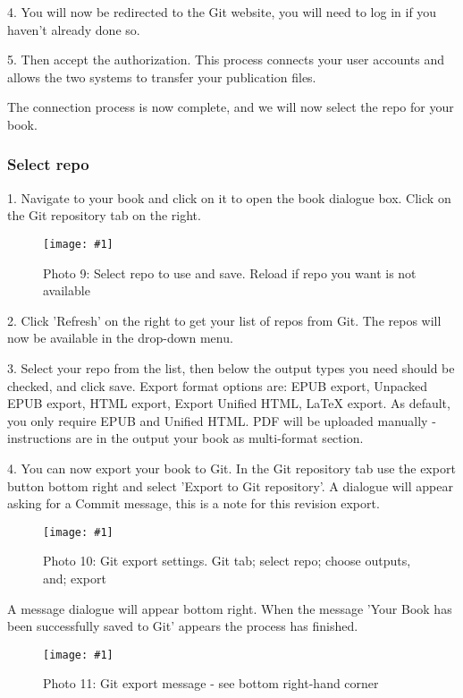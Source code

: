 \documentclass{article}
\newlength{\imgwidth}
\newcommand\scaledgraphics[2]{%
                
\settowidth{\imgwidth}{\texttt{[image: \#1]}}%
                
\setlength{\imgwidth}{\minof{\imgwidth}{#2\textwidth}}%
                
\texttt{[image: \#1]}%
                
}
\begin{document}
4. You will now be redirected to the Git website, you will need to log in if you haven't already done so.


5. Then accept the authorization. This process connects your user accounts and allows the two systems to transfer your publication files.


The connection process is now complete, and we will now select the repo for your book.


\subsubsection{Select repo}\label{H5346176}



1. Navigate to your book and click on it to open the book dialogue box. Click on the Git repository tab on the right.

\begin{figure}
\scaledgraphics{4b4e00ad-cd99-40b1-bb1e-5689bafe807a.png}{1}
\caption*{Photo 9: Select repo to use and save. Reload if repo you want is not available}\label{F77242471}
\end{figure}


2. Click 'Refresh' on the right to get your list of repos from Git. The repos will now be available in the drop-down menu.


3. Select your repo from the list, then below the output types you need should be checked, and click save. Export format options are: EPUB export, Unpacked EPUB export, HTML export, Export Unified HTML, LaTeX export. As default, you only require EPUB and Unified HTML. PDF will be uploaded manually - instructions are in the output your book as multi-format section.


4. You can now export your book to Git.  In the Git repository tab use the export button bottom right and select 'Export to Git repository'. A dialogue will appear asking for a Commit message, this is a note for this revision export.

\begin{figure}
\scaledgraphics{3936dcb7-7576-45c8-9a91-2340d2e18fb8.png}{1}
\caption*{Photo 10: Git export settings. Git tab; select repo; choose outputs, and; export}\label{F11158451}
\end{figure}


A message dialogue will appear bottom right. When the message 'Your Book has been successfully saved to Git' appears the process has finished. 

\begin{figure}
\scaledgraphics{8f55247e-9161-49d0-8688-0cbb8299ea13.png}{1}
\caption*{Photo 11: Git export message - see bottom right-hand corner}\label{F8159591}
\end{figure}
\end{document}
